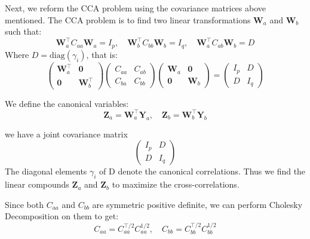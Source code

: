 Next, we reform the CCA problem using the covariance matrices above mentioned. The CCA problem is to find two linear transformations $\mathbf{W}_a$ and $\mathbf{W}_b$ such that:
\begin{equation}
     \mathbf{W}_a^\top C_{aa} \mathbf{W}_a = I_p, \quad  \mathbf{W}_b^\top C_{bb} \mathbf{W}_b = I_q, \quad  \mathbf{W}_a^\top C_{ab}  \mathbf{W}_b = D
\end{equation}
Where $D=\text{diag} (\gamma_i)$, that is:
\begin{equation}
\begin{pmatrix}
     \mathbf{W}_a^\top & {\mathbf 0}\\
    {\mathbf 0} &  \mathbf{W}_b^\top
    \end{pmatrix}
    \begin{pmatrix}
    C_{aa} & C_{ab}\\
    C_{ba} & C_{bb}
    \end{pmatrix}
    \begin{pmatrix}
     \mathbf{W}_a & {\mathbf 0}\\
    {\mathbf 0} &  \mathbf{W}_b
    \end{pmatrix}
    =
    \begin{pmatrix}
    I_p & D\\
    D & I_q
\end{pmatrix}
\end{equation}


We define the canonical variables:
\begin{equation}
    \mathbf{Z}_a= \mathbf{W}_a^\top \mathbf{Y}_a, \quad \mathbf{Z}_b = \mathbf{W}_b^\top \mathbf{Y}_b
\end{equation}

we have a joint covariance matrix
\begin{equation}
    \begin{pmatrix}
    I_p & D \\
    D & I_q
    \end{pmatrix}
\end{equation}
The diagonal elements $\gamma_i$ of D denote the canonical correlations. Thus we find the linear compounds $\mathbf{Z}_a$ and $\mathbf{Z}_b$ to maximize the cross-correlations.

Since both $C_{aa}$ and $C_{bb}$ are symmetric positive definite, we can perform Cholesky Decomposition on them to get:
\begin{equation}
    C_{aa} = C_{aa}^{\top/2} C_{aa}^{1/2}, \quad C_{bb} = C_{bb}^{\top/2} C_{bb}^{1/2}
\end{equation}

